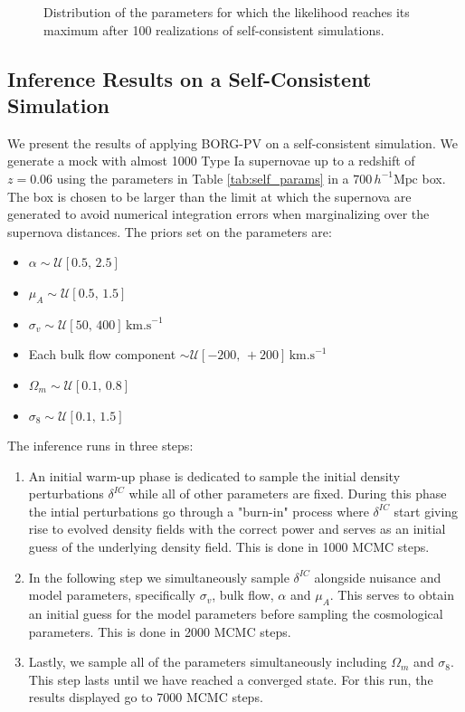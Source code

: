 \begin{figure}[htbp]
    \caption{Distribution of the parameters for which the likelihood reaches its maximum after 100 realizations of self-consistent simulations.}
    \label{fig:params_coverage}
\end{figure}





\subsection{Inference Results on a Self-Consistent Simulation}

We present the results of applying BORG-PV on a self-consistent simulation. We generate a mock with almost 1000 Type Ia supernovae up to a redshift of $z=0.06$ using the parameters in Table \ref{tab:self_params} 
in a $700 \, h^{-1}\text{Mpc}$ box. The box is chosen to be larger than the limit at which the supernova are generated to avoid numerical integration errors when marginalizing over 
the supernova distances. 
The priors set on the parameters are:
\begin{itemize}
    \item $\alpha \sim \mathcal{U}[0.5, \, 2.5]$
    \item $\mu_A \sim \mathcal{U}[0.5, \, 1.5]$
    \item $\sigma_v \sim \mathcal{U}[50, \, 400] \, \text{km.s}^{-1}$
    \item Each bulk flow component $\sim \mathcal{U}[-200, \, +200] \, \text{km.s}^{-1}$ 
    \item $\Omega_m \sim \mathcal{U}[0.1, \, 0.8]$
    \item $\sigma_8 \sim \mathcal{U}[0.1, \, 1.5]$
\end{itemize}
The inference runs in three steps: 
\begin{enumerate}
 \item An initial warm-up phase is dedicated to sample the initial density perturbations $\delta^{IC}$ while all of other parameters are fixed. 
 During this phase the intial perturbations go through a "burn-in" process where $\delta^{IC}$ start giving rise to evolved density fields with the correct 
 power and serves as an initial guess of the underlying density field. This is done in 1000 MCMC steps.
 \item In the following step we simultaneously sample $\delta^{IC}$ alongside nuisance and model parameters, specifically 
 $\sigma_v$, bulk flow, $\alpha$ and $\mu_A$. This serves to obtain an initial guess for the model parameters before sampling the cosmological parameters. This is done in 2000 MCMC steps.
 \item Lastly, we sample all of the parameters simultaneously including $\Omega_m$ and $\sigma_8$. This step lasts until we have reached a converged state. For this run, the 
results displayed go to 7000 MCMC steps. 
\end{enumerate}

